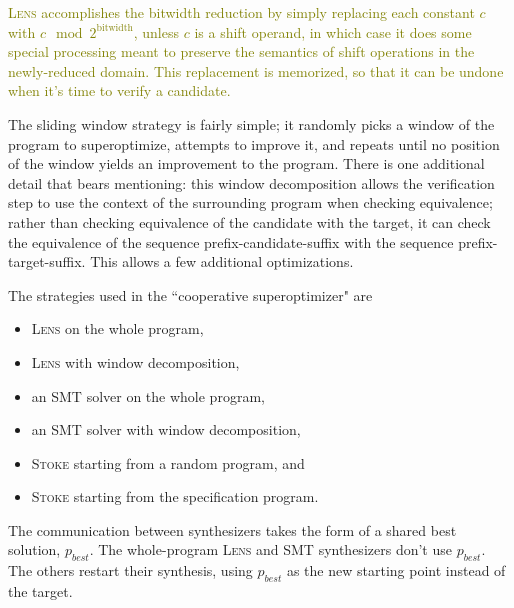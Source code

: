 \documentclass[12pt,twoside]{reedthesis}
\newcommand{\green}[1]{\textcolor{olive}{#1}}
\begin{document}
        \green{
        \textsc{Lens} accomplishes the bitwidth reduction by simply replacing each constant $c$ with $c \mod 2^\text{bitwidth}$, unless $c$ is a shift operand, in which case it does some special processing meant to preserve the semantics of shift operations in the newly-reduced domain.
        This replacement is memorized, so that it can be undone when it's time to verify a candidate.
        }
        
        The sliding window strategy is fairly simple; it randomly picks a window of the program to superoptimize, attempts to improve it, and repeats until no position of the window yields an improvement to the program.
        There is one additional detail that bears mentioning: 
            this window decomposition allows the verification step to use the context of the surrounding program when checking equivalence;
            rather than checking equivalence of the candidate with the target, it can check the equivalence of the sequence prefix-candidate-suffix with the sequence prefix-target-suffix.
        This allows a few additional optimizations.
        
        The strategies used in the ``cooperative superoptimizer" are
        \begin{itemize}
            \item \textsc{Lens} on the whole program,
            \item \textsc{Lens} with window decomposition,
            \item an SMT solver on the whole program,
            \item an SMT solver with window decomposition,
            \item \textsc{Stoke} starting from a random program, and
            \item \textsc{Stoke} starting from the specification program.
        \end{itemize}
        The communication between synthesizers takes the form of a shared best solution, $p_{best}$.
        The whole-program \textsc{Lens} and SMT synthesizers don't use $p_{best}$. The others restart their synthesis, using $p_{best}$ as the new starting point instead of the target.
        
\end{document}
